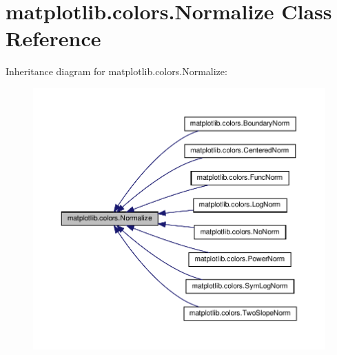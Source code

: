\hypertarget{classmatplotlib_1_1colors_1_1Normalize}{}\section{matplotlib.\+colors.\+Normalize Class Reference}
\label{classmatplotlib_1_1colors_1_1Normalize}


Inheritance diagram for matplotlib.\+colors.\+Normalize\+:
\nopagebreak
\begin{figure}[H]
\begin{center}
\leavevmode
\includegraphics[width=350pt]{classmatplotlib_1_1colors_1_1Normalize__inherit__graph}
\end{center}
\end{figure}
